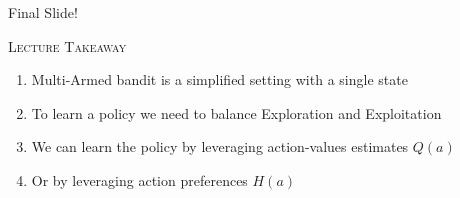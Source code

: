 \documentclass{beamer}
\newenvironment{takeaway}[1]{%
\definecolor{shadecolor}{gray}{0.9}%
	\begin{shaded}{\color{skymagenta}\noindent\textsc{#1}}\\%
	}{%
	\end{shaded}%
}
\begin{document}




\begin{frame}{Final Slide!}
	\begin{takeaway}{Lecture Takeaway}
		\begin{enumerate}
		    \item Multi-Armed bandit is a simplified setting with a single state
		    \item To learn a policy we need to balance Exploration and Exploitation
			\item We can learn the policy by leveraging action-values estimates $Q(a)$
			\item Or by leveraging action preferences $H(a)$
		\end{enumerate}
	\end{takeaway}
\end{frame}
\end{document}
